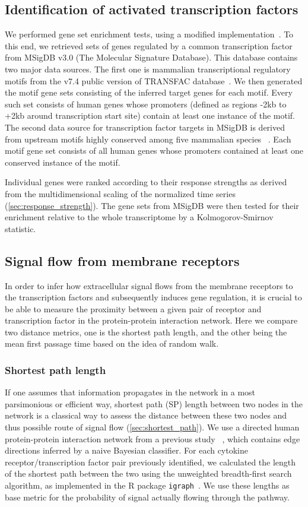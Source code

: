 \subsection{Identification of activated transcription factors}
We performed gene set enrichment tests, 
using a modified implementation~\citep{Luo2009}.
To this end, we retrieved sets of genes regulated by 
a common transcription factor from MSigDB v3.0 (The Molecular Signature Database). 
This database contains two major data sources. The first one is mammalian 
transcriptional regulatory motifs from the v7.4 public version of TRANSFAC 
database~\citep{Matys2003b}. We then generated the motif gene sets consisting 
of the inferred target genes for each motif. Every such set consists of human 
genes whose promoters (defined as regions -2kb to +2kb around transcription 
start site) contain at least one instance of the motif.
The second data source for transcription factor targets in MSigDB is derived 
from upstream motifs highly conserved among five mammalian species~%
\citep{Xie2005e}. Each motif gene set consists of all human genes whose 
promoters contained at least one conserved instance of the motif.

Individual genes were  ranked according to their response strengths as derived from the 
multidimensional scaling of the normalized time series 
(\ref{sec:response_strength}). 
The gene sets from MSigDB were  then tested for their enrichment 
 relative to the whole transcriptome by a Kolmogorov-Smirnov statistic. 

\subsection{Signal flow from membrane receptors}
In order to infer how extracellular signal flows from the membrane receptors to 
the transcription factors and subsequently induces gene regulation, it is 
crucial to be able to measure the proximity between a given pair of receptor and
transcription factor in the protein-protein interaction network. Here we 
compare two distance metrics, one is the shortest path length, and the other
being the mean first passage time based on the idea of random walk.

\subsubsection{Shortest path length}
If one assumes that information propagates in the network in a most parsimonious
or efficient way,
shortest path (SP) length between two nodes in the network is a classical way to
assess the distance between these two nodes and thus possible route of signal flow
(\ref{sec:shortest_path}).
We use a directed human protein-protein interaction network from a previous study%
~\citep{Vinayagam2011}, which contains edge directions
inferred by a naive Bayesian classifier.
For each cytokine receptor/transcription factor pair previously identified,
we calculated the length of the shortest path between the two
using the unweighted breadth-first search algorithm,
as implemented in the R package \texttt{igraph}~\citep{Csardi2006}.
We use these lengths as base metric for the probability 
of signal actually flowing through the pathway.

